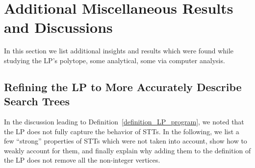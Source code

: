 \section{Additional Miscellaneous Results and Discussions}
In this section we list additional insights and results which were found while studying the LP's polytope, some analytical, some via computer analysis.

\subsection{Refining the LP to More Accurately Describe Search Trees}
\label{section_refining_the_LP}
In the discussion leading to Definition~\ref{definition_LP_program}, we noted that the LP does not fully capture the behavior of STTs. In the following, we list a few ``strong'' properties of STTs which were not taken into account, show how to weakly account for them, and finally explain why adding them to the definition of the LP does not remove all the non-integer vertices.

